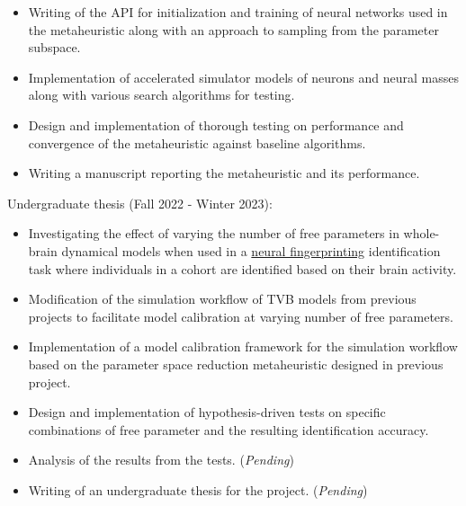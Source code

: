 \documentclass[margin, 10pt]{res} %
\begin{document}
\begin{resume}
\begin{itemize}
			\item Writing of the API for initialization and training of neural networks used in the metaheuristic along with an approach to sampling from the parameter subspace.
			\item Implementation of accelerated simulator models of neurons and neural masses along with various search algorithms for testing. 
			\item Design and implementation of thorough testing on performance and convergence of the metaheuristic against baseline algorithms.
			\item Writing a manuscript reporting the metaheuristic and its performance.
		\end{itemize}
		\vspace{-0.10cm}
		Undergraduate thesis (Fall 2022 - Winter 2023):
		\vspace*{0.15cm}
		\begin{itemize} \itemsep -2pt %
			\item[\ding{227}] Investigating the effect of varying the number of free parameters in whole-brain dynamical models when used in a \href{https://www.nature.com/articles/s41467-021-25895-8}{neural fingerprinting} identification task where individuals in a cohort are identified based on their brain activity.
			\item Modification of the simulation workflow of TVB models from previous projects to facilitate model calibration at varying number of free parameters.
			\item Implementation of a model calibration framework for the simulation workflow based on the parameter space reduction metaheuristic designed in previous project.
			\item Design and implementation of hypothesis-driven tests on specific combinations of free parameter and the resulting identification accuracy.
			\item Analysis of the results from the tests. (\textit{Pending}) 
			\item Writing of an undergraduate thesis for the project. (\textit{Pending}) 
		\end{itemize}
		
		

\end{resume}
\end{document}
